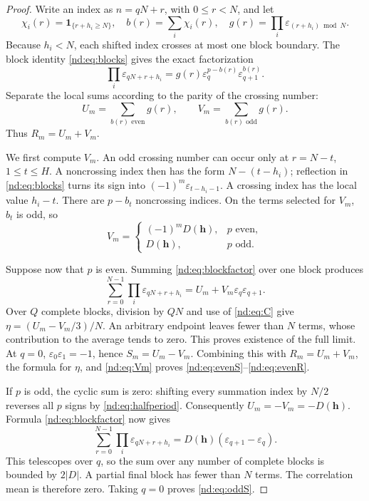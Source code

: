 \documentclass[11pt,a4paper,oneside,openany]{book}
\numberwithin{equation}{chapter}
\theoremstyle{definition}
\theoremstyle{remark}
\newcommand{\eps}{\varepsilon}
\begin{document}
\begin{proof}
Write an index as \(n=qN+r\), with \(0\le r<N\), and let
\[
 \chi_i(r)=\boldsymbol 1_{\{r+h_i\ge N\}},\quad
 b(r)=\sum_i\chi_i(r),\quad
 g(r)=\prod_i\eps_{(r+h_i)\bmod N}.
\]
Because \(h_i<N\), each shifted index crosses at most one block boundary.
The block identity \eqref{nd:eq:blocks} gives the exact factorization
\begin{equation}
 \prod_i\eps_{qN+r+h_i}
   =g(r)\eps_q^{p-b(r)}\eps_{q+1}^{b(r)}.
 \label{nd:eq:blockfactor}
\end{equation}
Separate the local sums according to the parity of the crossing number:
\[
 U_m=\sum_{b(r)\text{ even}}g(r),\qquad
 V_m=\sum_{b(r)\text{ odd}}g(r).
\]
Thus \(R_m=U_m+V_m\).

We first compute \(V_m\). An odd crossing number can occur only at
\(r=N-t\), \(1\le t\le H\). A noncrossing index then has the form
\(N-(t-h_i)\); reflection in \eqref{nd:eq:blocks} turns its sign into
\((-1)^m\eps_{t-h_i-1}\). A crossing index has the local value \(h_i-t\).
There are \(p-b_t\) noncrossing indices. On the terms selected for \(V_m\),
\(b_t\) is odd, so
\begin{equation}
 V_m=
 \begin{cases}
  (-1)^mD(\bm h),&p\text{ even},\\
  D(\bm h),&p\text{ odd}.
 \end{cases}
 \label{nd:eq:Vm}
\end{equation}

Suppose now that \(p\) is even. Summing \eqref{nd:eq:blockfactor} over one block
produces
\begin{equation}
 \sum_{r=0}^{N-1}\prod_i\eps_{qN+r+h_i}
       =U_m+V_m\eps_q\eps_{q+1}.
 \label{nd:eq:evenblock}
\end{equation}
Over \(Q\) complete blocks, division by \(QN\) and use of \eqref{nd:eq:C} give
\(\eta=(U_m-V_m/3)/N\). An arbitrary endpoint leaves fewer than \(N\) terms,
whose contribution to the average tends to zero. This proves existence of the
full limit. At \(q=0\), \(\eps_0\eps_1=-1\), hence \(S_m=U_m-V_m\). Combining
this with \(R_m=U_m+V_m\), the formula for \(\eta\), and \eqref{nd:eq:Vm} proves
\eqref{nd:eq:evenS}--\eqref{nd:eq:evenR}.

If \(p\) is odd, the cyclic sum is zero: shifting every summation index by
\(N/2\) reverses all \(p\) signs by \eqref{nd:eq:halfperiod}. Consequently
\(U_m=-V_m=-D(\bm h)\). Formula \eqref{nd:eq:blockfactor} now gives
\begin{equation}
 \sum_{r=0}^{N-1}\prod_i\eps_{qN+r+h_i}
       =D(\bm h)(\eps_{q+1}-\eps_q).
 \label{nd:eq:oddblock}
\end{equation}
This telescopes over \(q\), so the sum over any number of complete blocks is
bounded by \(2|D|\). A partial final block has fewer than \(N\) terms.
The correlation mean is therefore zero. Taking \(q=0\) proves
\eqref{nd:eq:oddS}.
\end{proof}
\end{document}
